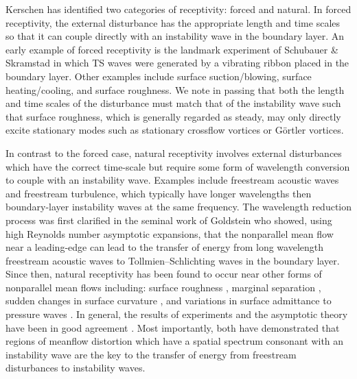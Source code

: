 Kerschen \cite{Kerschen:89} has identified two categories of receptivity:
forced and natural.  In forced receptivity, the external disturbance has the
appropriate length and time scales so that it can couple directly with an
instability wave in the boundary layer.  An early example of forced
receptivity is the landmark experiment of Schubauer \& Skramstad
\cite{ScSk:47} in which TS waves were generated by a vibrating ribbon placed
in the boundary layer.  Other examples include surface suction/blowing,
surface heating/cooling, and surface roughness.  We note in passing that both
the length and time scales of the disturbance must match that of the
instability wave such that surface roughness, which is generally regarded as
steady, may only directly excite stationary modes such as stationary crossflow
vortices or G\"ortler vortices.

In contrast to the forced case, natural receptivity involves external
disturbances which have the correct time-scale but require some form of
wavelength conversion to couple with an instability wave.  Examples include
freestream acoustic waves and freestream turbulence, which typically have
longer wavelengths then boundary-layer instability waves at the same
frequency.  The wavelength reduction process was first clarified in the
seminal work of Goldstein \cite{Goldstein:83} who showed, using high Reynolds
number asymptotic expansions, that the nonparallel mean flow near a
leading-edge can lead to the transfer of energy from long wavelength
freestream acoustic waves to Tollmien--Schlichting waves in the boundary layer.
Since then, natural receptivity has been found to occur near other forms of
nonparallel mean flows including: surface roughness
\cite{Ruban:84,Goldstein:85,ZhFe:87,ChKe:90}, marginal separation
\cite{GoLeCo:87}, sudden changes in surface curvature \cite{GoHu:87}, and
variations in surface admittance to pressure waves \cite{Choudhari:93}.  In
general, the results of experiments and the asymptotic theory have been in
good agreement \cite{Kerschen:89,KoRy:90}.  Most importantly, both have
demonstrated that regions of meanflow distortion which have a spatial spectrum
consonant with an instability wave are the key to the transfer of energy from
freestream disturbances to instability waves.

